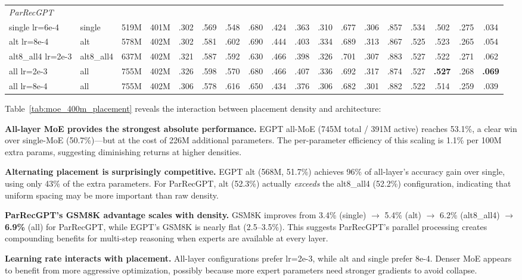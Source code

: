 \documentclass[oneside]{article}
\begin{document}
\begin{table}[t]
\begin{adjustbox}{max width=\textwidth}
\begin{tabular}{l|l|cc|ccccccccccc|c|cc}
\midrule
\multicolumn{18}{l}{\textit{ParRecGPT}} \\
single lr=6e-4       & single    & 519M & 401M & .302 & .569 & .548 & .680 & .424 & .363 & .310 & .677 & .306 & .857 & .534 & .502 & .275 & .034 \\
alt lr=8e-4          & alt       & 578M & 402M & .302 & .581 & .602 & .690 & .444 & .403 & .334 & .689 & .313 & .867 & .525 & .523 & .265 & .054 \\
alt8\_all4 lr=2e-3   & alt8\_all4 & 637M & 402M & .321 & .587 & .592 & .630 & .466 & .398 & .326 & .701 & .307 & .883 & .527 & .522 & .271 & .062 \\
all lr=2e-3          & all       & 755M & 402M & .326 & .598 & .570 & .680 & .466 & .407 & .336 & .692 & .317 & .874 & .527 & \textbf{.527} & .268 & \textbf{.069} \\
all lr=8e-4          & all       & 755M & 402M & .306 & .578 & .616 & .650 & .434 & .376 & .306 & .682 & .301 & .882 & .522 & .514 & .259 & .039 \\
\bottomrule
\end{tabular}
\end{adjustbox}
\end{table}

Table~\ref{tab:moe_400m_placement} reveals the interaction between placement density and architecture:

\textbf{All-layer MoE provides the strongest absolute performance.} EGPT all-MoE (745M total / 391M active) reaches 53.1\%, a clear win over single-MoE (50.7\%)---but at the cost of 226M additional parameters. The per-parameter efficiency of this scaling is 1.1\% per 100M extra params, suggesting diminishing returns at higher densities.

\textbf{Alternating placement is surprisingly competitive.} EGPT alt (568M, 51.7\%) achieves 96\% of all-layer's accuracy gain over single, using only 43\% of the extra parameters. For ParRecGPT, alt (52.3\%) actually \textit{exceeds} the alt8\_all4 (52.2\%) configuration, indicating that uniform spacing may be more important than raw density.

\textbf{ParRecGPT's GSM8K advantage scales with density.} GSM8K improves from 3.4\% (single) $\to$ 5.4\% (alt) $\to$ 6.2\% (alt8\_all4) $\to$ \textbf{6.9\%} (all) for ParRecGPT, while EGPT's GSM8K is nearly flat (2.5--3.5\%). This suggests ParRecGPT's parallel processing creates compounding benefits for multi-step reasoning when experts are available at every layer.

\textbf{Learning rate interacts with placement.} All-layer configurations prefer lr=2e-3, while alt and single prefer 8e-4. Denser MoE appears to benefit from more aggressive optimization, possibly because more expert parameters need stronger gradients to avoid collapse.
\end{document}

